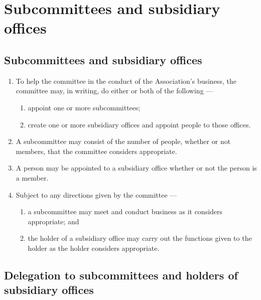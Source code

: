 \documentclass[../constitution.tex]{subfiles}
\begin{document}
\hypertarget{division-5-subcommittees-and-subsidiary-offices}{%
\section{Subcommittees and subsidiary offices}\label{division-5-subcommittees-and-subsidiary-offices}}

\hypertarget{subcommittees-and-subsidiary-offices}{%
\subsection{Subcommittees and subsidiary offices}\label{subcommittees-and-subsidiary-offices}}

\begin{enumerate}

\item To help the committee in the conduct of the Association's business, the committee may, in writing, do either or both of the following ---

  \begin{enumerate}
  
  \item appoint one or more subcommittees; \label{appoint-subcommittees}
  \item create one or more subsidiary offices and appoint people to those offices.
  \end{enumerate}
\item A subcommittee may consist of the number of people, whether or not members, that the committee considers appropriate.
\item A person may be appointed to a subsidiary office whether or not the person is a member.
\item Subject to any directions given by the committee ---

  \begin{enumerate}
  
  \item a subcommittee may meet and conduct business as it considers appropriate; and
  \item the holder of a subsidiary office may carry out the functions given to the holder as the holder considers appropriate.
  \end{enumerate}
\end{enumerate}

\hypertarget{delegation-to-subcommittees-and-holders-of-subsidiary-offices}{%
\subsection{Delegation to subcommittees and holders of subsidiary offices}\label{delegation-to-subcommittees-and-holders-of-subsidiary-offices}}
\end{document}
